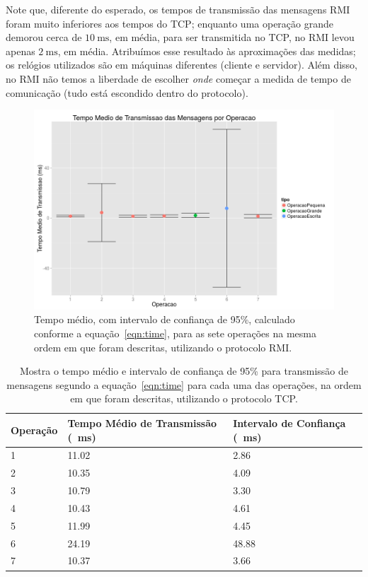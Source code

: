 \documentclass[12pt,a4paper]{article}
\begin{document}
Note que, diferente do esperado, os tempos de transmissão das mensagens RMI foram muito inferiores aos tempos do TCP;  enquanto uma operação grande demorou cerca de $\SI{10}{\milli\second}$, em média, para ser transmitida no TCP, no RMI levou apenas $\SI{2}{\milli\second}$, em média. Atribuímos esse resultado às aproximações das medidas; os relógios utilizados são em máquinas diferentes (cliente e servidor). Além disso, no RMI não temos a liberdade de escolher {\it onde} começar a medida de tempo de comunicação (tudo está escondido dentro do protocolo).

\begin{figure}[h]
\centering
\includegraphics[width=\textwidth]{resultadosTempoTransmissaoRMI.png}
\caption{Tempo médio, com intervalo de confiança de 95\%, calculado conforme a equação~\ref{eqn:time}, para as sete operações na mesma ordem em que foram descritas, utilizando o protocolo RMI.}
\label{fig:transmissaoR}
\end{figure}

\begin{table}[h]
\centering
\caption{Mostra o tempo médio e intervalo de confiança de 95\% para transmissão de mensagens segundo a equação~\ref{eqn:time} para cada uma das operações, na ordem em que foram descritas, utilizando o protocolo TCP.}
\label{table:transmissao}
\begin{tabular}{lll}
Operação & Tempo Médio de Transmissão (\SI{}{\milli\second}) & Intervalo de Confiança (\SI{}{\milli\second}) \\ \hline
1        & 11.02                & 2.86   \\
2        & 10.35                & 4.09   \\
3        & 10.79                & 3.30   \\
4        & 10.43                & 4.61   \\
5        & 11.99                & 4.45   \\
6        & 24.19                & 48.88  \\
7        & 10.37                & 3.66  
\end{tabular}
\end{table}
\end{document}
